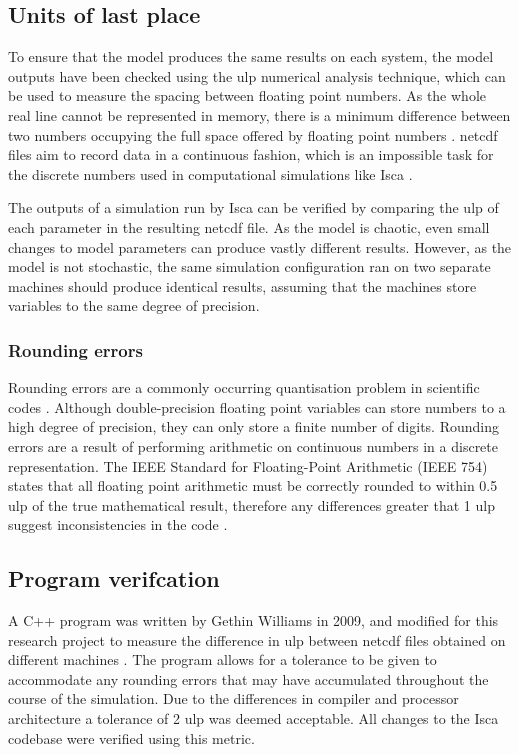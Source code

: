 \documentclass[a4paper,11pt]{report}
\begin{document}
\subsection{Units of last place}
To ensure that the model produces the same results on each system, the model outputs have been checked using the \gls{ulp} numerical analysis technique, which can be used to measure the spacing between floating point numbers. As the whole real line cannot be represented in memory, there is a minimum difference between two numbers occupying the full space offered by floating point numbers \cite{goldberg1991every}. \gls{netcdf} files aim to record data in a continuous fashion, which is an impossible task for the discrete numbers used in computational simulations like Isca \cite{rew1990netcdf}.
\par
The outputs of a simulation run by Isca can be verified by comparing the \gls{ulp} of each parameter in the resulting \gls{netcdf} file. As the model is chaotic, even small changes to model parameters can produce vastly different results. However, as the model is not stochastic, the same simulation configuration ran on two separate machines should produce identical results, assuming that the machines store variables to the same degree of precision. 

\subsubsection{Rounding errors}
Rounding errors are a commonly occurring quantisation problem in scientific codes \cite{goldberg1991every}. Although double-precision floating point variables can store numbers to a high degree of precision, they can only store a finite number of digits. Rounding errors are a result of performing arithmetic on continuous numbers in a discrete representation. The IEEE Standard for Floating-Point Arithmetic (IEEE 754) states that all floating point arithmetic must be correctly rounded to within 0.5 \gls{ulp} of the true mathematical result, therefore any differences greater that 1 \gls{ulp} suggest inconsistencies in the code \cite{goldberg1991every,ieee1985ieee}. 

\subsection{Program verifcation}
A C++ program was written by Gethin Williams in 2009, and modified for this research project to measure the difference in \gls{ulp} between \gls{netcdf} files obtained on different machines \cite{puma2018}. The program allows for a tolerance to be given to accommodate any rounding errors that may have accumulated throughout the course of the simulation. Due to the differences in compiler and processor architecture a tolerance of 2 \gls{ulp} was deemed acceptable. All changes to the Isca codebase were verified using this metric.
\end{document}
